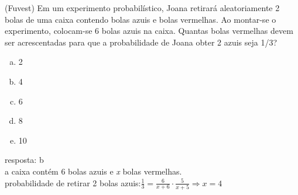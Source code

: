 \begin{ex}
  (Fuvest) Em um experimento probabilístico, Joana retirará aleatoriamente 2 bolas de uma caixa contendo bolas azuis e bolas vermelhas. Ao montar-se o experimento, colocam-se 6 bolas azuis na caixa. Quantas bolas vermelhas devem ser acrescentadas para que a probabilidade de Joana obter 2 azuis seja 1/3?
    \begin{enumerate}   [(a)]
        \item 2
        \item 4
        \item 6
        \item 8
        \item 10
    \end{enumerate}
      \begin{sol}
       resposta: b \\
       a caixa contém 6 bolas azuis e \textit{x} bolas vermelhas. \\
       probabilidade de retirar 2 bolas azuis:\hspace{0,3cm}$\frac{1}{3}=\frac{6}{x+6}\cdot\frac{5}{x+5} \Longrightarrow x=4$ 
      \end{sol}
 \end{ex}